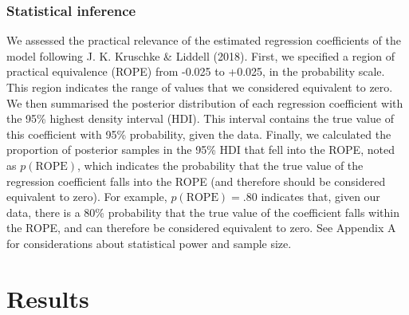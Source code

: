 \documentclass[
  12pt,
  b5paperpaper,
  twoside]{scrreprt}
\begin{document}
\hypertarget{statistical-inference}{%
\subsubsection{Statistical inference}\label{statistical-inference}}

We assessed the practical relevance of the estimated regression
coefficients of the model following J. K. Kruschke \& Liddell (2018).
First, we specified a region of practical equivalence (ROPE) from -0.025
to +0.025, in the probability scale. This region indicates the range of
values that we considered equivalent to zero. We then summarised the
posterior distribution of each regression coefficient with the 95\%
highest density interval (HDI). This interval contains the true value of
this coefficient with 95\% probability, given the data. Finally, we
calculated the proportion of posterior samples in the 95\% HDI that fell
into the ROPE, noted as \(p(\text{ROPE})\), which indicates the
probability that the true value of the regression coefficient falls into
the ROPE (and therefore should be considered equivalent to zero). For
example, \(p(\text{ROPE})=.80\) indicates that, given our data, there is
a 80\% probability that the true value of the coefficient falls within
the ROPE, and can therefore be considered equivalent to zero. See
Appendix A for considerations about statistical power and sample size.

\hypertarget{sec-results}{%
\section{Results}\label{sec-results}}
\end{document}
